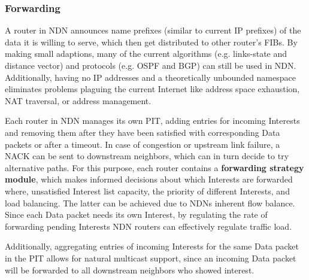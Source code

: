 \subsubsection{Forwarding}

A router in NDN announces name prefixes (similar to current IP prefixes) of the data it is willing to serve, which then get distributed to other router's FIBs. By making small adaptions, many of the current algorithms (e.g. links-state and distance vector) and protocols (e.g. OSPF and BGP) can still be used in NDN. Additionally, having no IP addresses and a theoretically unbounded namespace eliminates problems plaguing the current Internet like address space exhaustion, NAT traversal, or address management. 

Each router in NDN manages its own PIT, adding entries for incoming Interests and removing them after they have been satisfied with corresponding Data packets or after a timeout. In case of congestion or upstream link failure, a NACK can be sent to downstream neighbors, which can in turn decide to try alternative paths. For this purpose, each router contains a \textbf{forwarding strategy module}, which makes informed decisions about which Interests are forwarded where, unsatisfied Interest list capacity, the priority of different Interests, and load balancing. The latter can be achieved due to NDNs inherent flow balance. Since each Data packet needs its own Interest, by regulating the rate of forwarding pending Interests NDN routers can effectively regulate traffic load.

Additionally, aggregating entries of incoming Interests for the same Data packet in the PIT allows for natural multicast support, since an incoming Data packet will be forwarded to all downstream neighbors who showed interest. \cite{ZABJ14}
